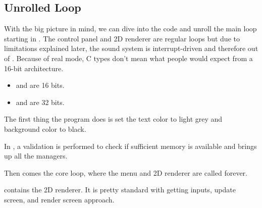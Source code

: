 \documentclass[book.tex]{subfiles}
\begin{document}
\subsection{Unrolled Loop}
With the big picture in mind, we can dive into the code and unroll the main loop starting in . The control panel and 2D renderer are regular loops but due to limitations explained later, the sound system is interrupt-driven and therefore out of . Because of real mode, C types don't mean what people would expect from a 16-bit architecture.
\begin{itemize}
\item {} and  are 16 bits.
\item {} and  are 32 bits.
\end{itemize}
\par
The first thing the program does is set the text color to light grey and background color to black.\\
\par
\begin{minipage}{\textwidth}

\end{minipage}
\par

\par
In , a validation is performed to check if sufficient memory is available and brings up all the managers.\\
\par
\begin{minipage}{\textwidth}

\end{minipage}
\par
Then comes the core loop, where the menu and 2D renderer are called forever.

\begin{minipage}{\textwidth}

\end{minipage}
\par
{} contains the 2D renderer. It is pretty standard with getting inputs, update screen, and render screen approach.\\
\par
\begin{minipage}{\textwidth}

\end{minipage} \\
\par
 
\end{document}
